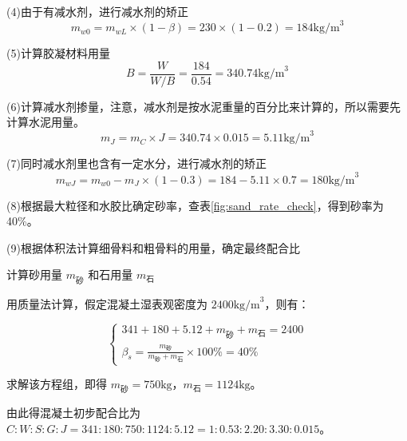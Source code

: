 \documentclass[12pt, a4paper, oneside, UTF8]{ctexbook}
\begin{document}
	(4)由于有减水剂，进行减水剂的矫正
	\[
	m_{w0} = m_{wL} \times (1 - \beta) = 230 \times (1 - 0.2) = 184 \text{kg/m}^3
	\]

	(5)计算胶凝材料用量
	\[
	B = \frac{W}{W/B} = \frac{184}{0.54} = 340.74 \text{kg/m}^3
	\]

	(6)计算减水剂掺量，注意，减水剂是按水泥重量的百分比来计算的，所以需要先计算水泥用量。
	\[
	m_J= m_C \times J =340.74 \times 0.015 = 5.11 \text{kg/m}^3
	\]

	(7)同时减水剂里也含有一定水分，进行减水剂的矫正
	\[
	m_{wJ} = m_{w0}-m_J \times (1 - 0.3) =184 - 5.11 \times 0.7 = 180 \text{kg/m}^3
	\]

	(8)根据最大粒径和水胶比确定砂率，查表\ref{fig:sand_rate_check}，得到砂率为40\%。

	(9)根据体积法计算细骨料和粗骨料的用量，确定最终配合比

	计算砂用量 \( m_{\text{砂}} \) 和石用量 \( m_{\text{石}} \)

用质量法计算，假定混凝土湿表观密度为 \( 2400 \text{kg/m}^3 \)，则有：

\[
\begin{cases}
341 + 180 + 5.12 + m_{\text{砂}} + m_{\text{石}} = 2400 \\
\beta_s = \frac{m_{\text{砂}}}{m_{\text{砂}} + m_{\text{石}}} \times 100\% = 40\%
\end{cases}
\]

求解该方程组，即得 \( m_{\text{砂}} = 750 \text{kg} \)，\( m_{\text{石}} = 1124 \text{kg} \)。

由此得混凝土初步配合比为 \( C:W:S:G:J = 341:180:750:1124:5.12 = 1:0.53:2.20:3.30:0.015 \)。

\ifx\allfiles\undefined
\end{document}
